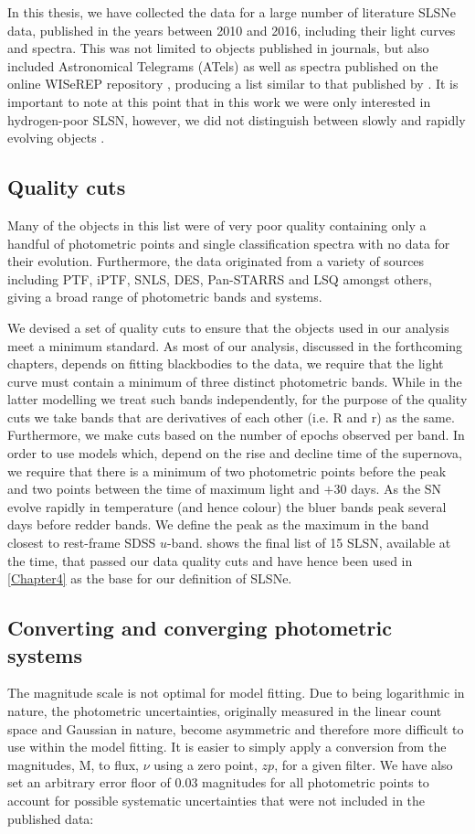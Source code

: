 In this thesis, we have collected the data for a large number of literature SLSNe data, published in the years between 2010 and 2016, including their light curves and spectra. This was not limited to objects published in journals, but also included Astronomical Telegrams (ATels) as well as spectra published on the online WISeREP repository \citep{Yaron2012}, producing a list similar to that published by \citet{Schulze2017}. It is important to note at this point that in this work we were only interested in hydrogen-poor SLSN, however, we did not distinguish between slowly and rapidly evolving objects \citep{Gal-Yam2012, Inserra2013}.

\subsection{Quality cuts}
Many of the objects in this list were of very poor quality containing only a handful of photometric points and single classification spectra with no data for their evolution. Furthermore, the data originated from a variety of sources including PTF, iPTF, SNLS, DES, Pan-STARRS and LSQ amongst others, giving a broad range of photometric bands and systems.

We devised a set of quality cuts to ensure that the objects used in our analysis meet a minimum standard. As most of our analysis, discussed in the forthcoming chapters, depends on fitting blackbodies to the data, we require that the light curve must contain a minimum of three distinct photometric bands. While in the latter modelling we treat such bands independently, for the purpose of the quality cuts we take bands that are derivatives of each other (i.e. R and r) as the same. Furthermore, we make cuts based on the number of epochs observed per band. In order to use models which, depend on the rise and decline time of the supernova, we require that there is a minimum of two photometric points before the peak and two points between the time of maximum light and $+30$ days. As the SN evolve rapidly in temperature (and hence colour) the bluer bands peak several days before redder bands. We define the peak as the maximum in the band closest to rest-frame SDSS $u$-band.  shows the final list of 15 SLSN, available at the time, that passed our data quality cuts and have hence been used in \cref{Chapter4} as the base for our definition of SLSNe.

\subsection{Converting and converging photometric systems}
The magnitude scale is not optimal for model fitting. Due to being logarithmic in nature, the photometric uncertainties, originally measured in the linear count space and Gaussian in nature, become asymmetric and therefore more difficult to use within the model fitting. It is easier to simply apply a conversion from the magnitudes, M, to flux, $\nu$ using a zero point, $zp$, for a given filter. We have also set an arbitrary error floor of 0.03 magnitudes for all photometric points to account for possible systematic uncertainties that were not included in the published data:

